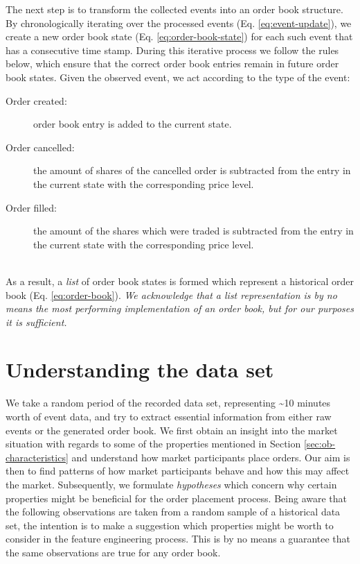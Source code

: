 The next step is to transform the collected events into an order book structure.
By chronologically iterating over the processed events (Eq. \ref{eq:event-update}), we create a new order book state (Eq. \ref{eq:order-book-state}) for each such event that has a consecutive time stamp.
During this iterative process we follow the rules below, which ensure that the correct order book entries remain in future order book states.
Given the observed event, we act according to the type of the event:
\begin{description}
    \item[Order created:] order book entry is added to the current state.
    \item[Order cancelled:] the amount of shares of the cancelled order is subtracted from the entry in the current state with the corresponding price level.
    \item[Order filled:] the amount of the shares which were traded is subtracted from the entry in the current state with the corresponding price level.
\end{description}
\hfill
\\
As a result, a \textit{list} of order book states is formed which represent a historical order book (Eq. \ref{eq:order-book}).
\textit{We acknowledge that a list representation is by no means the most performing implementation of an order book, but for our purposes it is sufficient.}

\vfill

\section{Understanding the data set}
\label{sec:data-hypotheses}

We take a random period of the recorded data set, representing \textasciitilde10 minutes worth of event data, and try to extract essential information from either raw events or the generated order book.
We first obtain an insight into the market situation with regards to some of the properties mentioned in Section \ref{sec:ob-characteristics} and understand how market participants place orders.
Our aim is then to find patterns of how market participants behave and how this may affect the market.
Subsequently, we formulate \textit{hypotheses} which concern why certain properties might be beneficial for the order placement process.
Being aware that the following observations are taken from a random sample of a historical data set, the intention is to make a suggestion which properties might be worth to consider in the feature engineering process.
This is by no means a guarantee that the same observations are true for any order book.

